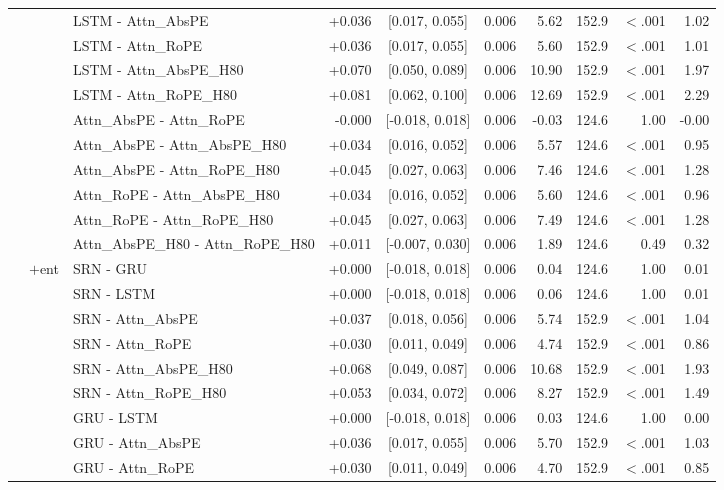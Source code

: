 \begin{longtable}{@{}lllrcrrrrr@{}}
 &  & LSTM - Attn\_AbsPE & +0.036 & [0.017, 0.055] & 0.006 & 5.62 & 152.9 & $<$.001 & 1.02 \\
 &  & LSTM - Attn\_RoPE & +0.036 & [0.017, 0.055] & 0.006 & 5.60 & 152.9 & $<$.001 & 1.01 \\
 &  & LSTM - Attn\_AbsPE\_H80 & +0.070 & [0.050, 0.089] & 0.006 & 10.90 & 152.9 & $<$.001 & 1.97 \\
 &  & LSTM - Attn\_RoPE\_H80 & +0.081 & [0.062, 0.100] & 0.006 & 12.69 & 152.9 & $<$.001 & 2.29 \\
 &  & Attn\_AbsPE - Attn\_RoPE & -0.000 & [-0.018, 0.018] & 0.006 & -0.03 & 124.6 & 1.00 & -0.00 \\
 &  & Attn\_AbsPE - Attn\_AbsPE\_H80 & +0.034 & [0.016, 0.052] & 0.006 & 5.57 & 124.6 & $<$.001 & 0.95 \\
 &  & Attn\_AbsPE - Attn\_RoPE\_H80 & +0.045 & [0.027, 0.063] & 0.006 & 7.46 & 124.6 & $<$.001 & 1.28 \\
 &  & Attn\_RoPE - Attn\_AbsPE\_H80 & +0.034 & [0.016, 0.052] & 0.006 & 5.60 & 124.6 & $<$.001 & 0.96 \\
 &  & Attn\_RoPE - Attn\_RoPE\_H80 & +0.045 & [0.027, 0.063] & 0.006 & 7.49 & 124.6 & $<$.001 & 1.28 \\
 &  & Attn\_AbsPE\_H80 - Attn\_RoPE\_H80 & +0.011 & [-0.007, 0.030] & 0.006 & 1.89 & 124.6 & 0.49 & 0.32 \\
\addlinespace[2pt]
 & $+$ent & SRN - GRU & +0.000 & [-0.018, 0.018] & 0.006 & 0.04 & 124.6 & 1.00 & 0.01 \\
 &  & SRN - LSTM & +0.000 & [-0.018, 0.018] & 0.006 & 0.06 & 124.6 & 1.00 & 0.01 \\
 &  & SRN - Attn\_AbsPE & +0.037 & [0.018, 0.056] & 0.006 & 5.74 & 152.9 & $<$.001 & 1.04 \\
 &  & SRN - Attn\_RoPE & +0.030 & [0.011, 0.049] & 0.006 & 4.74 & 152.9 & $<$.001 & 0.86 \\
 &  & SRN - Attn\_AbsPE\_H80 & +0.068 & [0.049, 0.087] & 0.006 & 10.68 & 152.9 & $<$.001 & 1.93 \\
 &  & SRN - Attn\_RoPE\_H80 & +0.053 & [0.034, 0.072] & 0.006 & 8.27 & 152.9 & $<$.001 & 1.49 \\
 &  & GRU - LSTM & +0.000 & [-0.018, 0.018] & 0.006 & 0.03 & 124.6 & 1.00 & 0.00 \\
 &  & GRU - Attn\_AbsPE & +0.036 & [0.017, 0.055] & 0.006 & 5.70 & 152.9 & $<$.001 & 1.03 \\
 &  & GRU - Attn\_RoPE & +0.030 & [0.011, 0.049] & 0.006 & 4.70 & 152.9 & $<$.001 & 0.85 \\

\end{longtable}
